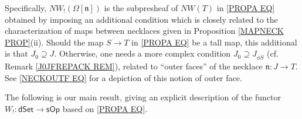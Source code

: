 \documentclass{hha}
\theoremstyle{definition} %
\begin{document}
	Specifically,
	$N W_!(\Omega[\mathfrak{n}])$ is the subpresheaf of 
	$NW(T)$ in \eqref{PROPA EQ}
	obtained by imposing an additional condition
	which is closely related to the characterization of 
	maps between necklaces
	given in Proposition \ref{MAPNECK PROP}(ii).
	Should the map $S\to T$ in \eqref{PROPA EQ} be a tall map,
	this additional is that $J_0 \supseteq J$.
	Otherwise, one needs a more complex condition 
	$J_0 \supseteq J_{\overline{\phi S}}$
	(cf. Remark \ref{J0JFREPACK REM}),	
	related to 
	``outer faces'' of the necklace $\mathfrak{n}\colon J\to T$.
	See \eqref{NECKOUTF EQ} for a depiction of this notion
	of outer face.


The following is our main result, 
giving an explicit description of the
functor $W_!\colon \mathsf{dSet} \to \mathsf{sOp}$
based on \eqref{PROPA EQ}.
\end{document}
